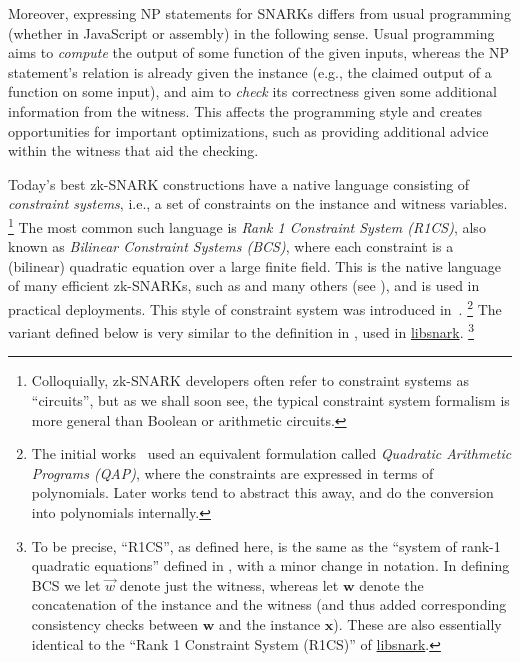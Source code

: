 \documentclass[a4paper,12pt]{article}
\newcommand{\wit}{w}
\newcommand{\vwit}{\vec{\wit}}
\begin{document}
Moreover, expressing NP statements for SNARKs differs from usual programming (whether in JavaScript or assembly) in the following sense. Usual programming aims to \emph{compute} the output of some function of the given inputs, whereas the NP statement's relation is already given the instance (e.g., the claimed output of a function on some input), and aim to \emph{check} its correctness given some additional information from the witness. This affects the programming style and creates opportunities for important optimizations, such as providing additional advice within the witness that aid the checking.


Today's best zk-SNARK constructions have a native language consisting of \emph{constraint systems}, i.e., a set of constraints on the instance and witness variables.%
%
\footnote{Colloquially, zk-SNARK developers often refer to constraint systems as ``circuits'', but as we shall soon see, the typical constraint system formalism is more general than Boolean or arithmetic circuits.} %
%
The most common such language is \emph{Rank 1 Constraint System (R1CS)}, also known as \emph{Bilinear Constraint Systems (BCS)}, where each constraint is a (bilinear) quadratic equation over a large finite field.  This is the native language of many efficient zk-SNARKs, such as \cite{GGPR13qsp,PHGR13pinocchio,BCGTV13csnark-crypto,BCTV13von,Groth16size} and many others (see \cite{ZKProofImplementation}), and is used in practical deployments.
This style of constraint system was introduced in~\cite{GGPR13qsp}.%
%
\footnote{The initial works~\cite{GGPR13qsp,PHGR13pinocchio} used an equivalent formulation called \emph{Quadratic Arithmetic Programs (QAP)}, where the constraints are expressed in terms of polynomials. Later works tend to abstract this away, and do the conversion into polynomials internally.} %
%
The variant defined below is very similar to the definition in \cite[Appendix~E]{BCGTV13csnark-eprint}, used in \href{https://github.com/scipr-lab/libsnark}{libsnark}.%
%
\footnote{To be precise, ``R1CS'', as defined here, is the same as the ``system of rank-1 quadratic equations'' defined in \cite[Appendix~E]{BCGTV13csnark-eprint}, with a minor change in notation. In defining BCS we let $\vwit$ denote just the witness, whereas \cite{BCGTV13csnark-eprint} let $\mathbf{w}$ denote the concatenation of the instance and the witness (and thus added corresponding consistency checks between $\mathbf{w}$ and the instance $\mathbf{x}$). These are also essentially identical to the ``Rank 1 Constraint System (R1CS)'' of \href{https://github.com/scipr-lab/libsnark}{libsnark}.}
\end{document}
